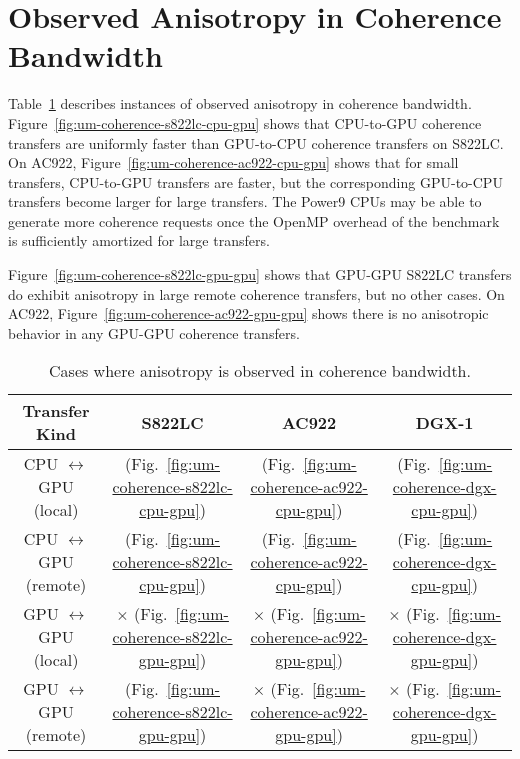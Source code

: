 \section{Observed Anisotropy in Coherence Bandwidth}

Table~\ref{tab:um-coherence-anisotropy} describes instances of observed anisotropy in coherence bandwidth.
Figure~\ref{fig:um-coherence-s822lc-cpu-gpu} shows that CPU-to-GPU coherence transfers are uniformly faster than GPU-to-CPU coherence transfers on S822LC.
On AC922, Figure~\ref{fig:um-coherence-ac922-cpu-gpu} shows that for small transfers, CPU-to-GPU transfers are faster, but the corresponding GPU-to-CPU transfers become larger for large transfers.
The Power9 CPUs may be able to generate more coherence requests once the OpenMP overhead of the benchmark is sufficiently amortized for large transfers.

Figure~\ref{fig:um-coherence-s822lc-gpu-gpu} shows that GPU-GPU S822LC transfers do exhibit anisotropy in large remote coherence transfers, but no other cases.
On AC922, Figure~\ref{fig:um-coherence-ac922-gpu-gpu} shows there is no anisotropic behavior in any GPU-GPU coherence transfers.

\begin{table}[ht]
	\centering
	\caption[Anisotropy in Coherence Bandwidth]{
		Cases where anisotropy is observed in coherence bandwidth.
	}
	\label{tab:um-coherence-anisotropy}
	\begin{tabular}{|c|c|c|c|}
		\hline
		\textbf{Transfer Kind}             & \textbf{S822LC}                                         & \textbf{AC922}                                         & \textbf{DGX-1}                            \\ \hline 
		CPU $\leftrightarrow$ GPU (local)  & \checkmark (Fig.~\ref{fig:um-coherence-s822lc-cpu-gpu}) & \checkmark (Fig.~\ref{fig:um-coherence-ac922-cpu-gpu}) & \checkmark (Fig.~\ref{fig:um-coherence-dgx-cpu-gpu}) \\ \hline
		CPU $\leftrightarrow$ GPU (remote) & \checkmark (Fig.~\ref{fig:um-coherence-s822lc-cpu-gpu}) & \checkmark (Fig.~\ref{fig:um-coherence-ac922-cpu-gpu}) & \checkmark (Fig.~\ref{fig:um-coherence-dgx-cpu-gpu}) \\ \hline
		GPU $\leftrightarrow$ GPU (local)  & $\times$   (Fig.~\ref{fig:um-coherence-s822lc-gpu-gpu}) & $\times$   (Fig.~\ref{fig:um-coherence-ac922-gpu-gpu}) & $\times$ (Fig.~\ref{fig:um-coherence-dgx-gpu-gpu}) \\ \hline
		GPU $\leftrightarrow$ GPU (remote) & \checkmark (Fig.~\ref{fig:um-coherence-s822lc-gpu-gpu}) & $\times$   (Fig.~\ref{fig:um-coherence-ac922-gpu-gpu}) & $\times$ (Fig.~\ref{fig:um-coherence-dgx-gpu-gpu}) \\ \hline
	\end{tabular}
\end{table}

